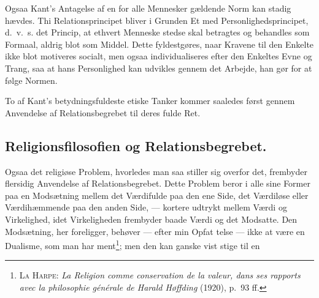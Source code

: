 \documentclass[12pt]{article}
\newcommand{\opage}[1]{\marginnote{\footnotesize\textit{[#1]}}}
\begin{document}
Ogsaa Kant's Antagelse af en for alle Mennesker gældende Norm kan
stadig hævdes. Thi Relationsprincipet bliver i Grunden Et med
Personlighedsprincipet, d.\ v.\ s. det Princip, at ethvert Menneske
stedse skal betragtes og behandles som Formaal, aldrig blot som
Middel. Dette fyldestgøres, naar Kravene til den Enkelte ikke blot
motiveres socialt, men ogsaa individualiseres efter den Enkeltes Evne
og Trang, saa at hans Personlighed kan udvikles gennem det Arbejde,
han gør for at følge Normen.

To af Kant's betydningsfuldeste etiske Tanker kommer saaledes først
gennem Anvendelse af Relationsbegrebet til deres fulde Ret.

\subsection{Religionsfilosofien og Relationsbegrebet.}\label{sec:4f}
\noindent
Ogsaa det religiøse Problem, hvorledes man saa stiller sig overfor det,
frembyder flersidig Anvendelse af Relationsbegrebet. Dette Problem
beror i alle sine Former paa en Modsætning mellem det Værdifulde paa
den ene Side, det Værdiløse eller Værdihæmmende paa den anden Side,
--- kortere udtrykt mellem Værdi og Virkelighed, idet Virkeligheden
frembyder baade Værdi og det Modsatte. Den Modsætning, her foreligger,
behøver --- efter min Opfat%
\opage{95}\setcounter{footnote}{0}%
telse --- ikke at være en Dualisme, som man har
ment\footnote{\textsc{La Harpe}: \textit{La Religion comme conservation
de la valeur, dans ses rapports avec la philosophie générale de Harald
Høffding} (1920), p.~93 ff.}; men den kan ganske vist stige til en
\end{document}
